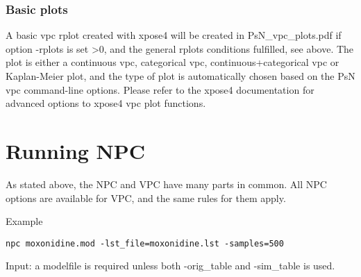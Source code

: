 \subsubsection*{Basic plots}
A basic vpc rplot created with xpose4 will be created in 
PsN\_vpc\_plots.pdf if option -rplots is set >0,
and the general rplots conditions fulfilled, see above.
The plot is either a continuous vpc, categorical vpc, continuous+categorical vpc or Kaplan-Meier 
plot, and the type of plot is automatically chosen based on the PsN vpc command-line options.
Please refer to the xpose4 documentation for advanced options to xpose4 vpc plot functions.
\section{Running NPC}
As stated above, the NPC and VPC have many parts in common. All NPC options are available for VPC, and the same rules for them apply.

Example
\begin{verbatim}
npc moxonidine.mod -lst_file=moxonidine.lst -samples=500 
\end{verbatim}

Input: a modelfile is required unless both -orig\_table and -sim\_table is used.


